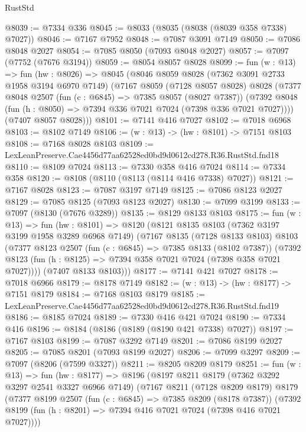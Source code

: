 \begin{lexlean}{RustStd}
\begin{coremodule}
@8039 := @7334 @336
@8045 := @8033 (@8035 (@8038 (@8039 @358 @7338) @7027))
@8046 := @7167 @7952
@8048 := @7087 @3091 @7149
@8050 := @7086 @8048 @2027
@8054 := @7085 @8050 (@7093 @8048 @2027)
@8057 := @7097 (@7752 (@7676 @3194))
@8059 := @8054 @8057 @8028
@8099 := fun (w : @13) =>
  fun (hw : @8026) =>
  @8045
    (@8046
      @8059
      @8028
      (@7362 @3091 @2733 @1958 @3194 @6970 @7149)
      (@7167
        @8059
        (@7128 @8057 @8028)
        @8028
        (@7377
          @8048
          @2507
          (fun (c : @6845) => @7385 @8057 (@8027 @7387))
          (@7392 @8048 (fun (h : @8050) => @7394 @336 @7021 @7024 (@7398 @336 @7021 @7027))))
        (@7407 @8057 @8028)))
@8101 := @7141 @416 @7027
@8102 := @7018 @6968
@8103 := @8102 @7149
@8106 := (w : @13) -> (hw : @8101) -> @7151 @8103
@8108 := @7168 @8028 @8103
@8109 := LexLeanPreserve.Cae4456d77aa62528ed0bd9d0612cd278.R36.RustStd.fnd18
@8110 := @8109 @7024
@8113 := @7330 @358 @416 @7024
@8114 := @7334 @358
@8120 := @8108 (@8110 (@8113 (@8114 @416 @7338) @7027))
@8121 := @7167 @8028
@8123 := @7087 @3197 @7149
@8125 := @7086 @8123 @2027
@8129 := @7085 @8125 (@7093 @8123 @2027)
@8130 := @7099 @3199
@8133 := @7097 (@8130 (@7676 @3289))
@8135 := @8129 @8133 @8103
@8175 := fun (w : @13) =>
  fun (hw : @8101) =>
  @8120
    (@8121
      @8135
      @8103
      (@7362 @3197 @3199 @1958 @3289 @6968 @7149)
      (@7167
        @8135
        (@7128 @8133 @8103)
        @8103
        (@7377
          @8123
          @2507
          (fun (c : @6845) => @7385 @8133 (@8102 @7387))
          (@7392 @8123 (fun (h : @8125) => @7394 @358 @7021 @7024 (@7398 @358 @7021 @7027))))
        (@7407 @8133 @8103)))
@8177 := @7141 @421 @7027
@8178 := @7018 @6966
@8179 := @8178 @7149
@8182 := (w : @13) -> (hw : @8177) -> @7151 @8179
@8184 := @7168 @8103 @8179
@8185 := LexLeanPreserve.Cae4456d77aa62528ed0bd9d0612cd278.R36.RustStd.fnd19
@8186 := @8185 @7024
@8189 := @7330 @416 @421 @7024
@8190 := @7334 @416
@8196 := @8184 (@8186 (@8189 (@8190 @421 @7338) @7027))
@8197 := @7167 @8103
@8199 := @7087 @3292 @7149
@8201 := @7086 @8199 @2027
@8205 := @7085 @8201 (@7093 @8199 @2027)
@8206 := @7099 @3297
@8209 := @7097 (@8206 (@7599 @3327))
@8211 := @8205 @8209 @8179
@8251 := fun (w : @13) =>
  fun (hw : @8177) =>
  @8196
    (@8197
      @8211
      @8179
      (@7362 @3292 @3297 @2541 @3327 @6966 @7149)
      (@7167
        @8211
        (@7128 @8209 @8179)
        @8179
        (@7377
          @8199
          @2507
          (fun (c : @6845) => @7385 @8209 (@8178 @7387))
          (@7392 @8199 (fun (h : @8201) => @7394 @416 @7021 @7024 (@7398 @416 @7021 @7027))))

\end{coremodule}
\end{lexlean}
